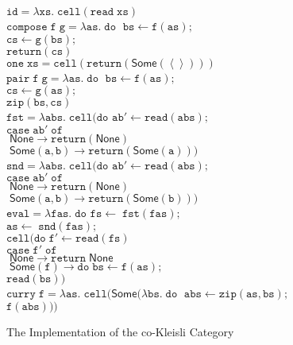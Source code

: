 \documentclass[preprint]{sigplanconf}
\newcommand{\term}[1]{\ensuremath{\mathtt{{#1}}}}
\newcommand{\unitval}{\left<\right>}
\newcommand{\None}{\mathsf{None}}
\newcommand{\Some}[1]{\mathsf{Some}({#1})}
\begin{document}
\begin{figure}
\begin{tabbing}
\term{id = \lambda xs.\;cell(read\;xs)} 
\\[1em]

\term{compose\;f\;g =\lambda as.\; do\;}
 \=\term{bs \leftarrow f(as);} \\
 \>\term{cs \leftarrow g(bs);} \\
 \>\term{return(cs)} 
\\[1em]

\term{one\;xs = cell(return(\Some{\unitval}))}
\\[1em]

\term{pair\;f\;g = \lambda as.\;do\;}
  \=\term{bs \leftarrow f(as);} \\
  \>\term{cs \leftarrow g(as);} \\
  \>\term{zip(bs,cs)}
\\[1em]

\term{fst = \lambda abs.\;cell(do}
  \= \term{ab' \leftarrow read(abs);} \\
  \>\term{case \; ab'\; of} \\
  \>\term{\;\None \to return(\None)} \\
  \>\term{\;\Some{a,b} \to return(\Some{a}))} 
\\[1em]


\term{snd = \lambda abs.\;cell(do}
  \= \term{ab' \leftarrow read(abs);} \\
  \>\term{case \; ab'\; of} \\
  \>\term{\;\None \to return(\None)} \\
  \>\term{\;\Some{a,b} \to return(\Some{b}))} 
\\[1em]

\term{eval = \lambda fas.\;do}\;
              \=\term{fs \leftarrow \;fst(fas);}\\
              \>\term{as \leftarrow \;snd(fas);}\\
              \>\term{cell(do\;}\=\term{f' \leftarrow read(fs)}\\
              \>                  \>\term{case\;f'\;of}\\
              \>                  \>\term{\;\None \to return\;\None} \\
              \>                  \>\term{\;\Some{f} \to do\;}\=\term{bs \leftarrow f(as);} \\
              \>                  \>                            \>$\term{read(bs)})$ 
\\[1em]

\term{curry\;f =\lambda as.\;cell(\mathsf{Some}(\lambda bs.\;do\;}
  \=\term{abs \leftarrow zip(as,bs);}\\
  \>\term{f(abs)))}
\end{tabbing}
\caption{The Implementation of the co-Kleisli Category}
\label{cokleisli-implementation}
\end{figure}
\end{document}
